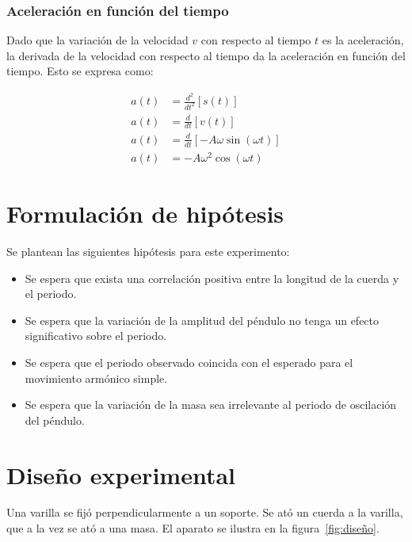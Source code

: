 \documentclass[twocolumn]{article}
\numberwithin{table}{section}
\begin{document}
\subsubsection{Aceleración en función del tiempo}

Dado que la variación de la velocidad $v$ con respecto al tiempo $t$
es la aceleración, la derivada de la velocidad con respecto al tiempo
da la aceleración en función del tiempo. Esto se expresa como:

\begin{align}
  a(t) &= \frac{d^{2}}{dt^{2}} \left[s(t)\right] \nonumber \\
  a(t) &= \frac{d}{dt} \left[v(t)\right] \nonumber \\
  a(t) &= \frac{d}{dt} \left[-A\omega\sin{(\omega t)}\right] \nonumber \\
  a(t) &= -A\omega^{2}\cos{(\omega t)}\label{eq:aceleración_tiempo}
\end{align}

\section{Formulación de hipótesis}

Se plantean las siguientes hipótesis para este experimento:

\begin{itemize}
  \item Se espera que exista una correlación positiva entre la longitud
    de la cuerda y el periodo.
  \item Se espera que la variación de la amplitud del péndulo no tenga un
    efecto significativo sobre el periodo.
  \item Se espera que el periodo observado coincida con el esperado para el
    movimiento armónico simple.
  \item Se espera que la variación de la masa sea irrelevante al periodo
    de oscilación del péndulo.
\end{itemize}

\section{Diseño experimental}

Una varilla se fijó perpendicularmente a un soporte. Se ató un cuerda a
la varilla, que a la vez se ató a una masa. El aparato se ilustra en la
figura~\ref{fig:diseño}.
\end{document}
